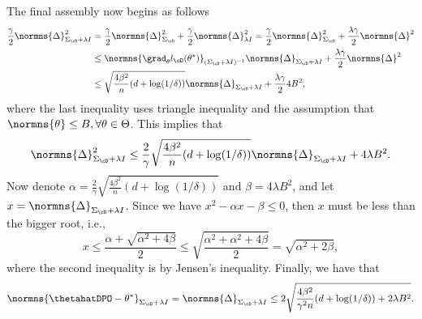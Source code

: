 The final assembly now begins as follows
\begin{align*}
    \frac{\gamma}{2}\normns{\Delta}^2_{\Sigma_{\cD}+\lambda I} &= \frac{\gamma}{2}\normns{\Delta}^2_{\Sigma_{\cD}} + \frac{\gamma}{2}\normns{\Delta}_{\lambda I}^2 =\frac{\gamma}{2}\normns{\Delta}^2_{\Sigma_{\cD}} + \frac{\lambda\gamma}{2}\normns{\Delta}^2 \\
    &\leq \normns{\grad_\theta l_{\cD}(\theta^*)}_{(\Sigma_{\cD}+\lambda I)^{-1}}\normns{\Delta}_{\Sigma_{\cD}+\lambda I} + \frac{\lambda\gamma}{2}\normns{\Delta}^2 \\
    &\leq \sqrt{\frac{4\beta^2}{n}(d+\log(1/\delta))}\normns{\Delta}_{\Sigma_{\cD}+\lambda I} + \frac{\lambda\gamma}{2}4B^2,
\end{align*}
where the last inequality uses triangle inequality and the assumption that $\normns{\theta} \leq B, \forall \theta\in\Theta$. This implies that
\begin{equation*}
    \normns{\Delta}^2_{\Sigma_{\cD}+\lambda I} \leq \frac{2}{\gamma}\sqrt{\frac{4\beta^2}{n}(d+\log(1/\delta))}\normns{\Delta}_{\Sigma_{\cD}+\lambda I} + 4\lambda B^2.
\end{equation*}
Now denote $\alpha=\frac{2}{\gamma}\sqrt{\frac{4\beta^2}{n}(d+\log(1/\delta))}$ and $\beta = 4\lambda B^2$, and let $x = \normns{\Delta}_{\Sigma_{\cD}+\lambda I}$. Since we have $x^2-\alpha x -\beta \leq 0$, then $x$ must be less than the bigger root, i.e.,
\begin{equation*}
    x\leq \frac{\alpha+\sqrt{\alpha^2+4\beta}}{2} \leq \sqrt{\frac{\alpha^2+\alpha^2+4\beta}{2}} = \sqrt{\alpha^2 + 2\beta},
\end{equation*}
where the second inequality is by Jensen's inequality. Finally, we have that
\begin{equation*}
    \normns{\thetahatDPO - \theta^*}_{\Sigma_{\cD}+\lambda I} = \normns{\Delta}_{\Sigma_{\cD}+\lambda I} \leq 2 \sqrt{\frac{4\beta^2}{\gamma^2 n}(d+\log(1/\delta)) + 2\lambda B^2}.
\end{equation*}

